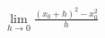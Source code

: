 \documentclass[preview]{standalone}
\begin{document}
\begin{align*}
\lim_{h\to 0} \frac{(x_0+h)^2-x_0^2}{h}
\end{align*}
\end{document}

